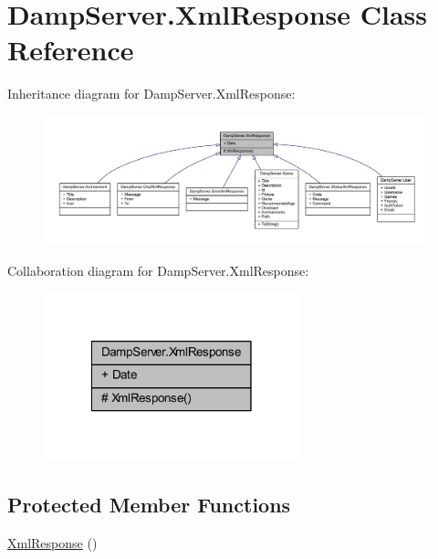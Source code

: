 \hypertarget{class_damp_server_1_1_xml_response}{\section{Damp\-Server.\-Xml\-Response Class Reference}
\label{class_damp_server_1_1_xml_response}
}


Inheritance diagram for Damp\-Server.\-Xml\-Response\-:\nopagebreak
\begin{figure}[H]
\begin{center}
\leavevmode
\includegraphics[width=350pt]{class_damp_server_1_1_xml_response__inherit__graph}
\end{center}
\end{figure}


Collaboration diagram for Damp\-Server.\-Xml\-Response\-:\nopagebreak
\begin{figure}[H]
\begin{center}
\leavevmode
\includegraphics[width=210pt]{class_damp_server_1_1_xml_response__coll__graph}
\end{center}
\end{figure}
\subsection*{Protected Member Functions}
\begin{DoxyCompactItemize}
\item 
\hyperlink{class_damp_server_1_1_xml_response_a0111f5e34b3788531b8d18cb99eaf510}{Xml\-Response} ()
\end{DoxyCompactItemize}
